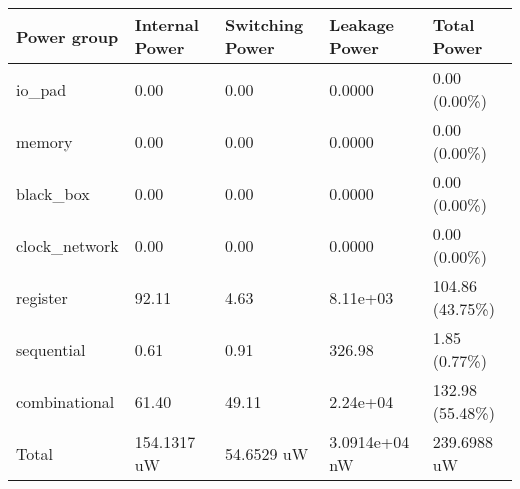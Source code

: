 \begin{tabular}{|lllll|}
\hline
\textbf{Power group} &               \textbf{Internal Power}    &     \textbf{Switching Power}    &      \textbf{Leakage Power}      &     \textbf{Total Power}\\\hline
io\_pad            & 0.00         &   0.00 &           0.0000         &   0.00 (0.00\%)\\
memory            & 0.00        &    0.00  &          0.0000        &    0.00 (0.00\%)\\
black\_box         & 0.00       &     0.00   &         0.0000       &     0.00 (0.00\%)\\
clock\_network     & 0.00      &      0.00   &        0.0000      &      0.00 (0.00\%)\\
register         & 92.11     &       4.63     &   8.11e+03     &     104.86 (43.75\%)\\
sequential       &  0.61    &        0.91     &    326.98    &        1.85 (0.77\%)\\
combinational    & 61.40   &        49.11      &  2.24e+04   &       132.98 (55.48\%)\\
\hline
Total         &   154.1317 uW     &   54.6529 uW   &  3.0914e+04 nW     &  239.6988 uW \\\hline
\end{tabular}